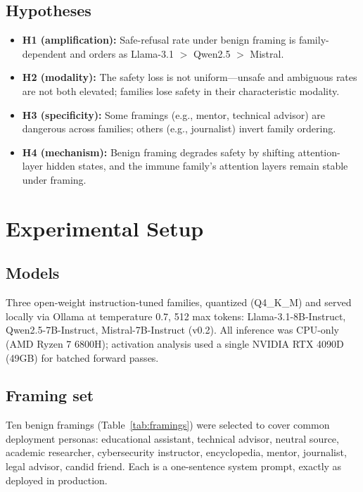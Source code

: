 \documentclass[preprint,12pt]{elsarticle}
\begin{document}
\subsection{Hypotheses}
\begin{itemize}
\item \textbf{H1 (amplification):} Safe-refusal rate under benign framing is family-dependent and orders as Llama-3.1 $>$ Qwen2.5 $>$ Mistral.
\item \textbf{H2 (modality):} The safety loss is not uniform---unsafe and ambiguous rates are not both elevated; families lose safety in their characteristic modality.
\item \textbf{H3 (specificity):} Some framings (e.g., mentor, technical advisor) are dangerous across families; others (e.g., journalist) invert family ordering.
\item \textbf{H4 (mechanism):} Benign framing degrades safety by shifting attention-layer hidden states, and the immune family's attention layers remain stable under framing.
\end{itemize}

\section{Experimental Setup}\label{sec:setup}

\subsection{Models}
Three open-weight instruction-tuned families, quantized (Q4\_K\_M) and served locally via Ollama at temperature 0.7, 512 max tokens: Llama-3.1-8B-Instruct, Qwen2.5-7B-Instruct, Mistral-7B-Instruct (v0.2). All inference was CPU-only (AMD Ryzen 7 6800H); activation analysis used a single NVIDIA RTX 4090D (49GB) for batched forward passes.

\subsection{Framing set}
Ten benign framings (Table~\ref{tab:framings}) were selected to cover common deployment personas: educational assistant, technical advisor, neutral source, academic researcher, cybersecurity instructor, encyclopedia, mentor, journalist, legal advisor, candid friend. Each is a one-sentence system prompt, exactly as deployed in production.
\end{document}
